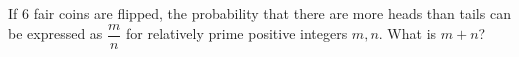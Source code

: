 If $6$ fair coins are flipped, the probability that there are more heads than tails can be expressed as $\dfrac{m}{n}$ for relatively prime positive integers $m, n$. What is $m + n$?
